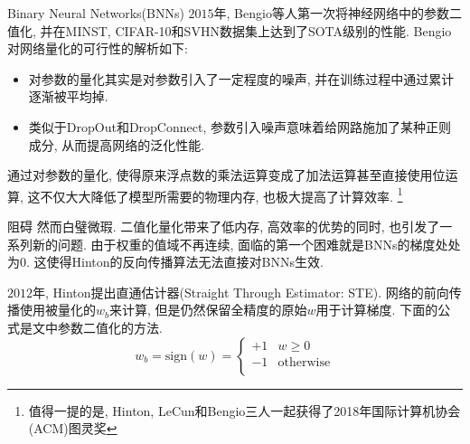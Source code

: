 \documentclass{beamer}
\newcommand\blfootnote[1]{%
  \begingroup
  \renewcommand\thefootnote{}\footnote{#1}%
  \addtocounter{footnote}{-1}%
  \endgroup
}
\begin{document}
\begin{frame}{Binary Neural Networks(BNNs)}
    \footnotesize
    $2015$年, Bengio\cite{courbariaux2015binaryconnect}等人第一次将神经网络中的参数二值化, 并在MINST, CIFAR-10和SVHN数据集上达到了SOTA级别的性能. Bengio对网络量化的可行性的解析如下:
    \begin{itemize}
        \item 对参数的量化其实是对参数引入了一定程度的噪声, 并在训练过程中通过累计逐渐被平均掉.
        \item 类似于DropOut和DropConnect, 参数引入噪声意味着给网路施加了某种正则成分, 从而提高网络的泛化性能.
    \end{itemize}
    通过对参数的量化, 使得原来浮点数的乘法运算变成了加法运算甚至直接使用位运算, 这不仅大大降低了模型所需要的物理内存, 也极大提高了计算效率.
    \blfootnote{\noindent \tiny{值得一提的是, Hinton, LeCun和Bengio三人一起获得了2018年国际计算机协会(ACM)图灵奖}}
\end{frame}

\begin{frame}{阻碍}
    \footnotesize
    然而白璧微瑕. 二值化量化带来了低内存, 高效率的优势的同时, 也引发了一系列新的问题. 由于权重的值域不再连续, 面临的第一个困难就是BNNs的梯度处处为$0$. 这使得Hinton的反向传播算法无法直接对BNNs生效. 

    $2012$年, Hinton提出直通估计器(Straight Through Estimator: STE)\cite{bengio2013estimating}. 网络的前向传播使用被量化的$w_b$来计算, 但是仍然保留全精度的原始$w$用于计算梯度. 下面的公式是文中参数二值化的方法.
    \begin{equation}
        w_b=\mathrm{sign}(w)=\begin{cases}
            +1&		w\geqslant 0\\
            -1&		\mathrm{otherwise}\\
        \end{cases}
    \end{equation}
\end{frame}
\end{document}
